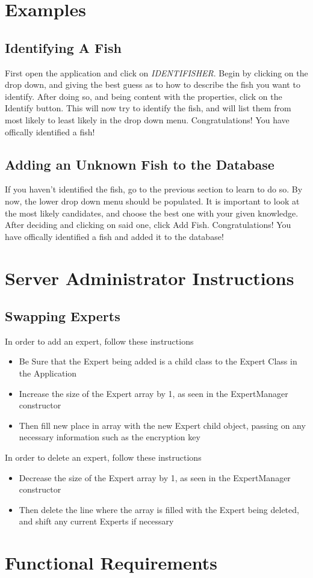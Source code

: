 \documentclass{article}
\begin{document}
\section{Examples}

\subsection{Identifying A Fish}
First open the application and click on \textit{IDENTIFISHER}. Begin by clicking on the drop down, and giving the best guess as to how to describe the fish you want to identify. After doing so, and being content with the properties, click on the Identify button. This will now try to identify the fish, and will list them from most likely to least likely in the drop down menu. Congratulations! You have offically identified a fish!

\subsection{Adding an Unknown Fish to the Database}
If you haven't identified the fish, go to the previous section to learn to do so. By now, the lower drop down menu should be populated. It is important to look at the most likely candidates, and choose the best one with your given knowledge. After deciding and clicking on said one, click Add Fish. Congratulations! You have offically identified a fish and added it to the database!

\section{Server Administrator Instructions}

\subsection{Swapping Experts}
In order to add an expert, follow these instructions
\begin{itemize} 
	\item Be Sure that the Expert being added is a child class to the Expert Class in the Application
	\item Increase the size of the Expert array by 1, as seen in the ExpertManager constructor
	\item Then fill new place in array with the new Expert child object, passing on any necessary information such as the encryption key
\end{itemize}
In order to delete an expert, follow these instructions
\begin{itemize} 
	\item Decrease the size of the Expert array by 1, as seen in the ExpertManager constructor
	\item Then delete the line where the array is filled with the Expert being deleted, and shift any current Experts if necessary 
\end{itemize}

\section{Functional Requirements}

\newpage
\listoffigures
\end{document}
